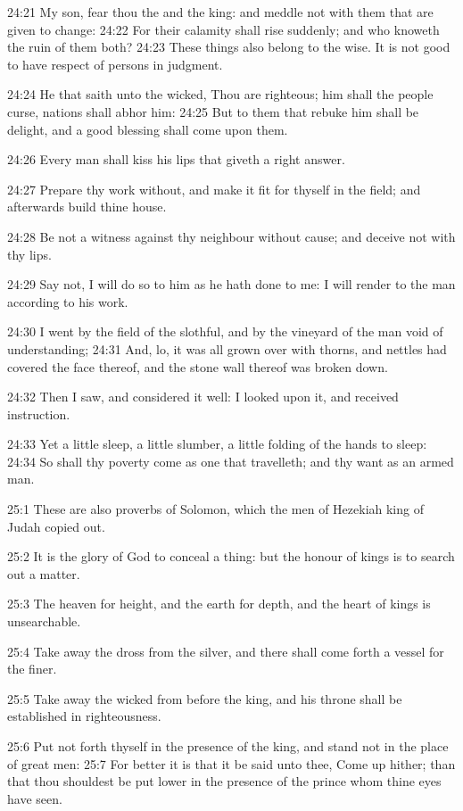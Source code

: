 24:21 My son, fear thou the \LORD and the king: and meddle not with them that are given to change: 24:22 For their calamity shall rise suddenly; and who knoweth the ruin of them both?  24:23 These things also belong to the wise. It is not good to have respect of persons in judgment.

24:24 He that saith unto the wicked, Thou are righteous; him shall the people curse, nations shall abhor him: 24:25 But to them that rebuke him shall be delight, and a good blessing shall come upon them.

24:26 Every man shall kiss his lips that giveth a right answer.

24:27 Prepare thy work without, and make it fit for thyself in the field; and afterwards build thine house.

24:28 Be not a witness against thy neighbour without cause; and deceive not with thy lips.

24:29 Say not, I will do so to him as he hath done to me: I will render to the man according to his work.

24:30 I went by the field of the slothful, and by the vineyard of the man void of understanding; 24:31 And, lo, it was all grown over with thorns, and nettles had covered the face thereof, and the stone wall thereof was broken down.

24:32 Then I saw, and considered it well: I looked upon it, and received instruction.

24:33 Yet a little sleep, a little slumber, a little folding of the hands to sleep: 24:34 So shall thy poverty come as one that travelleth; and thy want as an armed man.

25:1 These are also proverbs of Solomon, which the men of Hezekiah king of Judah copied out.

25:2 It is the glory of God to conceal a thing: but the honour of kings is to search out a matter.

25:3 The heaven for height, and the earth for depth, and the heart of kings is unsearchable.

25:4 Take away the dross from the silver, and there shall come forth a vessel for the finer.

25:5 Take away the wicked from before the king, and his throne shall be established in righteousness.

25:6 Put not forth thyself in the presence of the king, and stand not in the place of great men: 25:7 For better it is that it be said unto thee, Come up hither; than that thou shouldest be put lower in the presence of the prince whom thine eyes have seen.


